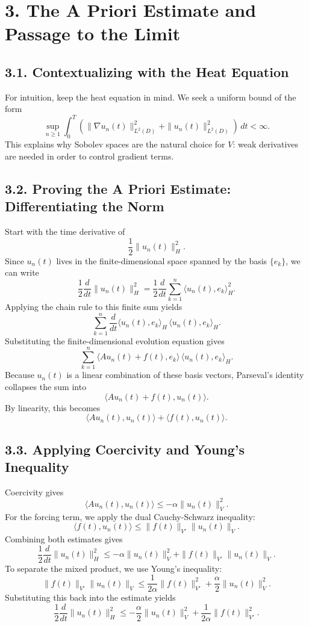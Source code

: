 \documentclass[11pt]{article}
\theoremstyle{definition}
\theoremstyle{remark}
\begin{document}
\section*{3. The A Priori Estimate and Passage to the Limit}

\subsection*{3.1. Contextualizing with the Heat Equation}
For intuition, keep the heat equation in mind. We seek a uniform bound of the form
\[
\sup_{n\ge 1}\int_0^T
\left(
\|\nabla u_n(t)\|_{L^2(D)}^2+\|u_n(t)\|_{L^2(D)}^2
\right)\,dt
<\infty.
\]
This explains why Sobolev spaces are the natural choice for \(V\): weak derivatives are needed in order to control gradient terms.

\subsection*{3.2. Proving the A Priori Estimate: Differentiating the Norm}
Start with the time derivative of
\[
\frac12\|u_n(t)\|_H^2.
\]
Since \(u_n(t)\) lives in the finite-dimensional space spanned by the basis \(\{e_k\}\), we can write
\[
\frac12\frac{d}{dt}\|u_n(t)\|_H^2
=
\frac12\frac{d}{dt}\sum_{k=1}^n \langle u_n(t),e_k\rangle_H^2.
\]
Applying the chain rule to this finite sum yields
\[
\sum_{k=1}^n
\frac{d}{dt}\langle u_n(t),e_k\rangle_H\,
\langle u_n(t),e_k\rangle_H.
\]
Substituting the finite-dimensional evolution equation gives
\[
\sum_{k=1}^n
\langle Au_n(t)+f(t),e_k\rangle\,
\langle u_n(t),e_k\rangle_H.
\]
Because \(u_n(t)\) is a linear combination of these basis vectors, Parseval's identity collapses the sum into
\[
\langle Au_n(t)+f(t),u_n(t)\rangle.
\]
By linearity, this becomes
\[
\langle Au_n(t),u_n(t)\rangle+\langle f(t),u_n(t)\rangle.
\]

\subsection*{3.3. Applying Coercivity and Young's Inequality}
Coercivity gives
\[
\langle Au_n(t),u_n(t)\rangle\le -\alpha\|u_n(t)\|_V^2.
\]
For the forcing term, we apply the dual Cauchy-Schwarz inequality:
\[
\langle f(t),u_n(t)\rangle
\le
\|f(t)\|_{V'}\|u_n(t)\|_V.
\]
Combining both estimates gives
\[
\frac12\frac{d}{dt}\|u_n(t)\|_H^2
\le
-\alpha\|u_n(t)\|_V^2+\|f(t)\|_{V'}\|u_n(t)\|_V.
\]
To separate the mixed product, we use Young's inequality:
\[
\|f(t)\|_{V'}\|u_n(t)\|_V
\le
\frac{1}{2\alpha}\|f(t)\|_{V'}^2+\frac{\alpha}{2}\|u_n(t)\|_V^2.
\]
Substituting this back into the estimate yields
\[
\frac12\frac{d}{dt}\|u_n(t)\|_H^2
\le
-\frac{\alpha}{2}\|u_n(t)\|_V^2+\frac{1}{2\alpha}\|f(t)\|_{V'}^2.
\]
\end{document}
